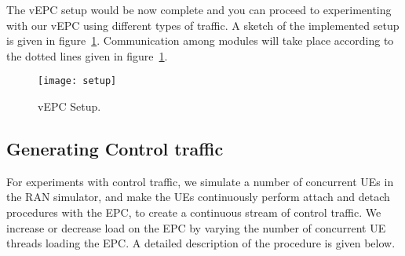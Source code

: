 \documentclass[hidelinks]{report}
\begin{document}
The vEPC setup would be now complete and you can proceed to experimenting with our vEPC using different types of traffic. A sketch of the implemented setup is given in figure~\ref{setup}. Communication among modules will take place according to the dotted lines given in figure~\ref{setup}.

\begin{figure}[H]

\centering
\texttt{[image: setup]}
\caption{vEPC Setup.}
\label{setup}

\end{figure}

\subsection*{Generating Control traffic}

For experiments with control traffic, we simulate a number of concurrent UEs in the RAN simulator, and make the UEs continuously perform attach and detach procedures with the EPC, to create a continuous stream of control traffic. We increase or decrease load on the EPC by varying the number of concurrent UE threads loading the EPC. A detailed description of the procedure is given below.
\end{document}
